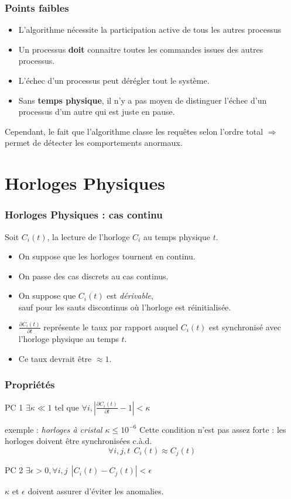 \documentclass[compress]{beamer}
\begin{document}
\begin{frame}
\frametitle{Points faibles}
\begin{itemize}
\item L'algorithme nécessite la participation active de tous les autres processus
\item Un processus \textbf{doit} connaitre toutes les commandes issues des autres processus. 
\item L'échec d'un processus peut dérégler tout le système.
\item Sans \textbf{\color{cyan} temps physique}, il n'y a pas moyen de distinguer l'échec d'un processus d'un autre qui est juste en pause.
\end{itemize}
Cependant, le fait que l'algorithme classe les requêtes selon l'ordre total $\Rightarrow$ permet de détecter les comportements anormaux.
\end{frame}


\section{Horloges Physiques}
\begin{frame}
\frametitle{Horloges Physiques : cas continu}
Soit $C_i(t)$, la lecture de l'horloge $C_i$ au temps physique $t$.
\begin{itemize}
\item On suppose que les horloges tournent en continu.
\item On passe des cas discrets au cas continus.
\item On suppose que $C_i(t)$ est \textit{dérivable},\\
	sauf pour les sauts discontinus où l'horloge est réinitialisée.
\item $\frac{\partial C_i(t)}{\partial t}$ représente le taux par rapport auquel $C_i(t)$ est synchronisé avec l'horloge physique au temps $t$.
\item Ce taux devrait être $\approx 1$.
\end{itemize}
\end{frame}

\begin{frame}
\frametitle{Propriétés}
\begin{block}{PC 1}
$\exists \kappa \ll 1$ tel que $\forall i, |\frac{\partial C_i(t)}{\partial t} - 1| < \kappa$
\end{block}
exemple : \textit{horloges à cristal $\kappa \leq 10^{-6}$}
Cette condition n'est pas assez forte : les horloges doivent être synchronisées c.à.d.
\[\forall i, j, t \ \ C_i(t) \approx C_j(t)\]
\begin{block}{PC 2}
$\exists \epsilon > 0, \forall i, j \ \ |C_i(t) - C_j(t)| < \epsilon$
\end{block}
$\kappa$ et $\epsilon$ doivent assurer d'éviter les anomalies.\\
\end{frame}
\end{document}
